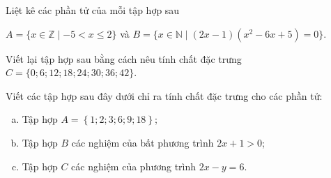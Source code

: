 \begin{bt}%
	\begin{listEX}[1]
		\item Liệt kê các phần tử của mỗi  tập hợp sau
		\begin{center}
			$A=\{ x\in \mathbb{Z}  \mid -5<x\leq 2\}$ và
			$B=\{ x\in \mathbb{N}  \mid(2x-1)(x^2-6x+5)=0\}$.
		\end{center}\vspace{-1.5cm}
		\item Viết lại tập hợp sau bằng cách nêu tính chất đặc  trưng $C=\{ 0;6;12;18;24;30;36;42 \}$.
	\end{listEX}
\end{bt}

\begin{bt}%
	Viết các tập hợp sau  đây dưới chỉ ra tính chất đặc trưng cho các phần tử:
	\begin{enumerate}[a)]
		\item Tập  hợp $ A=\left\{1;2;3;6;9;18\right\} $;
		\item Tập hợp $ B $ các nghiệm của bất phương trình $ 2x+1>0  $;
		\item Tập  hợp $ C $ các nghiệm của phương trình $ 2x-y=6 $.
	\end{enumerate}
\end{bt}

